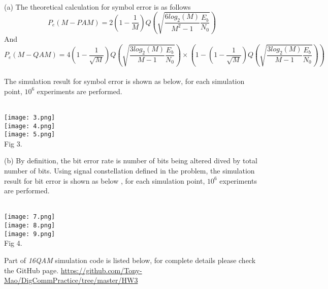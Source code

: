 \documentclass [12pt] {article}
\begin{document}
 ~\\
 (a) The theoretical calculation for symbol error is as follows\\
 $$ P_e(M-PAM) = 2 (1-\frac{1}{M})Q(\sqrt{\frac{6 log_2(M)}{M^2-1} \frac{E_b}{N_0}})$$
 And 
  $$ P_e(M-QAM) = 4 (1 - \frac{1}{\sqrt{M}}) Q(\sqrt{\frac{3 log_2(M)}{M-1} \frac{E_b}{N_0}}) \times(1-(1-\frac{1}{\sqrt{M}})Q(\sqrt{\frac{3 log_2(M)}{M-1} \frac{E_b}{N_0}}))$$
  ~\\
 The simulation result for symbol error is shown as below, for each simulation point, $10^6$ experiments are performed.\\
 ~\\
 \begin{center}
 \texttt{[image: 3.png]}\\
 \texttt{[image: 4.png]}\\
 \texttt{[image: 5.png]}\\
 Fig 3.
 \end{center}
 (b)  By definition, the bit error rate is number of bits being altered dived by total number of bits. Using signal constellation defined in the problem, the simulation result for bit error is shown as below , for each simulation point, $10^6$ experiments are performed.\\
 ~\\
  \begin{center}
 \texttt{[image: 7.png]}\\
 \texttt{[image: 8.png]}\\
 \texttt{[image: 9.png]}\\
 Fig 4.
 \end{center}
Part of \emph{16QAM} simulation code is listed below, for complete details please check the GitHub page.  \url{https://github.com/Tony-Mao/DigCommPractice/tree/master/HW3}\\
~\\
\lstset{basicstyle=\footnotesize\ttfamily,breaklines=true}
\lstset{framextopmargin=50pt}
\end{document}
